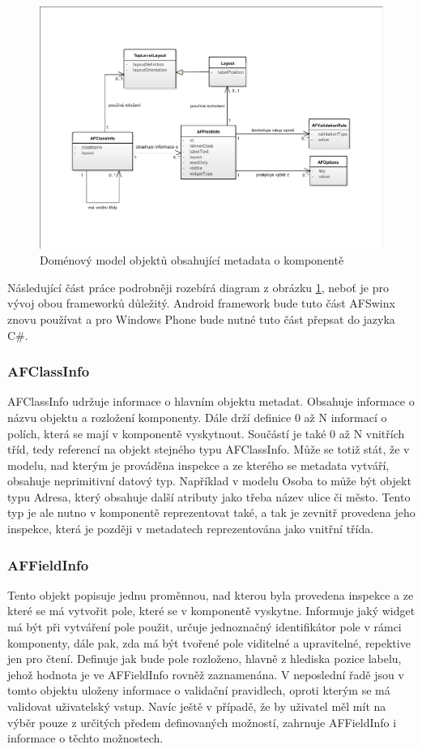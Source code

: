 \begin{figure}[h!]
\includegraphics[width=\textwidth]{figures/domainModel}
\caption{Doménový model objektů obsahující metadata o komponentě}
\label{img:metadataModel}
\end{figure}

Následující část práce podrobněji rozebírá diagram z obrázku \ref{img:metadataModel}, neboť je pro vývoj obou frameworků důležitý. Android framework bude tuto část AFSwinx znovu používat a pro Windows Phone bude nutné tuto část přepsat do jazyka C\#.
\subsubsection{AFClassInfo}
AFClassInfo udržuje informace o hlavním objektu metadat. Obsahuje informace o názvu objektu a rozložení komponenty. Dále drží definice 0 až N informací o polích, která se mají v komponentě vyskytnout. Součástí je také 0 až N vnitřích tříd, tedy referencí na objekt stejného typu AFClassInfo. Může se totiž stát, že v modelu, nad kterým je prováděna inspekce a ze kterého se metadata vytváří, obsahuje neprimitivní datový typ. Například v modelu Osoba to může být objekt typu Adresa, který obsahuje další atributy jako třeba název ulice či město. Tento typ je ale nutno v komponentě reprezentovat také, a tak je zevnitř provedena jeho inspekce, která je později v metadatech reprezentována jako vnitřní třída. 

\subsubsection{AFFieldInfo}
Tento objekt popisuje jednu proměnnou, nad kterou byla provedena inspekce a ze které se má vytvořit pole, které se v komponentě vyskytne. Informuje jaký widget má být při vytváření pole použit, určuje jednoznačný identifikátor pole v rámci komponenty, dále pak, zda má být tvořené pole viditelné a upravitelné, repektive jen pro čtení. Definuje jak bude pole rozloženo, hlavně z hlediska pozice labelu, jehož hodnota je ve AFFieldInfo rovněž zaznamenána. V neposlední řadě jsou v tomto objektu uloženy informace o validační pravidlech, oproti kterým se má validovat uživatelský vstup. Navíc ještě v případě, že by uživatel měl mít na výběr pouze z určitých předem definovaných možností, zahrnuje AFFieldInfo i informace o těchto možnostech. 

